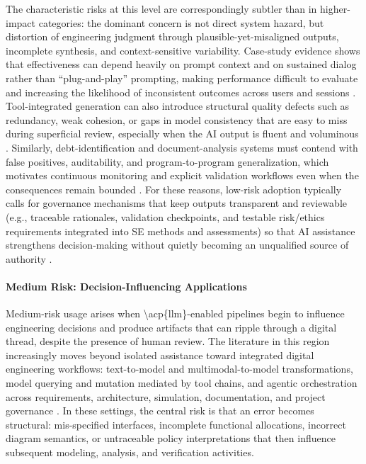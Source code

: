 The characteristic risks at this level are correspondingly subtler than in higher-impact categories: the dominant concern is not direct system hazard, but distortion of engineering judgment through plausible-yet-misaligned outputs, incomplete synthesis, and context-sensitive variability. Case-study evidence shows that effectiveness can depend heavily on prompt context and on sustained dialog rather than “plug-and-play” prompting, making performance difficult to evaluate and increasing the likelihood of inconsistent outcomes across users and sessions \cite{chagnon_CaseStudyAI_2024}. Tool-integrated generation can also introduce structural quality defects such as redundancy, weak cohesion, or gaps in model consistency that are easy to miss during superficial review, especially when the AI output is fluent and voluminous \cite{johns_AISystemsModeling_2024}. Similarly, debt-identification and document-analysis systems must contend with false positives, auditability, and program-to-program generalization, which motivates continuous monitoring and explicit validation workflows even when the consequences remain bounded \cite{Ouzzif_Leveraging_AI_Manage_Technical_Debt_Test_Evaluation_2025}. For these reasons, low-risk adoption typically calls for governance mechanisms that keep outputs transparent and reviewable (e.g., traceable rationales, validation checkpoints, and testable risk/ethics requirements integrated into SE methods and assessments) so that AI assistance strengthens decision-making without quietly becoming an unqualified source of authority \cite{heckle2024responsible, Farrington_Reiner_Responsible_Use_AI_Sustainability_2024}.


\paragraph{Medium Risk: Decision-Influencing Applications }

Medium-risk usage arises when \textbackslash{}acp\{llm\}-enabled pipelines begin to influence engineering decisions and produce artifacts that can ripple through a digital thread, despite the presence of human review. The literature in this region increasingly moves beyond isolated assistance toward integrated digital engineering workflows: text-to-model and multimodal-to-model transformations, model querying and mutation mediated by tool chains, and agentic orchestration across requirements, architecture, simulation, documentation, and project governance \cite{Bradshaw_Accelerating_Systems_Engineering_Generative_AI_2025, Helmerich_Transforming_Systems_Engineering_Agentic_AI_2025, Wach_LLMs_Accelerate_Complex_Systems_2024, vangundy_DevelopingConceptsOperationsUsing_2024, naveau_LLMCopilotsDomainSpecific_2024}. In these settings, the central risk is that an error becomes structural: mis-specified interfaces, incomplete functional allocations, incorrect diagram semantics, or untraceable policy interpretations that then influence subsequent modeling, analysis, and verification activities. 


